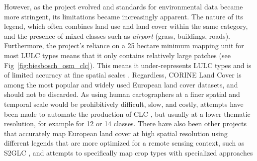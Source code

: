         However, as the project evolved and standards for environmental data became more stringent, its limitations became increasingly apparent. 
        The nature of its legend, which often combines land use and land cover within the same category, and the presence of mixed classes such as \textit{airport} (grass, buildings, roads).
        Furthermore, the project's reliance on a 25 hectare minimum mapping unit for most LULC types means that it only contains relatively large patches (see Fig\@~\ref{fig:biesbosch_osm_clc}). This means it under-represents LULC types and is of limited accuracy at fine spatial scales \citep{buttner2014corine,aune2021content, pflugmacher2019mapping}. Regardless, CORINE Land Cover is among the most popular and widely used European land cover datasets, and should not be discarded. As using human cartographers at a finer spatial and temporal scale would be prohibitively difficult, slow, and costly, attempts have been made to automate the production of CLC \citep{buttner2014corine}, but usually at a lower thematic resolution, for example for 12 \citep{pflugmacher2019mapping} or 14 \citep{bhugra2022rapidai4eo} classes. There have also been other projects that accurately map European land cover at high spatial resolution using different legends that are more optimized for a remote sensing context, such as S2GLC \citep{malinowski2020}, and attempts to specifically map crop types with specialized approaches \citep{dandrimont2021parcel,luo2022developing}
        
